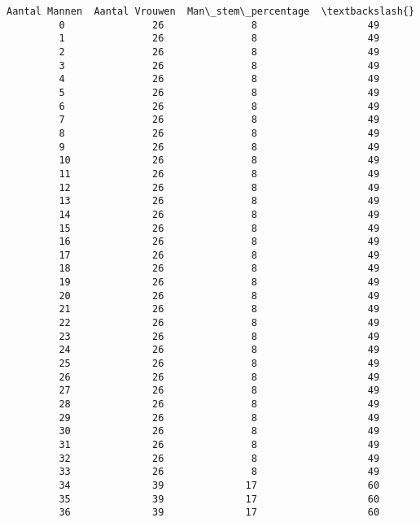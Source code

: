 \documentclass{article}
\begin{document}
\begin{Verbatim}[commandchars=\\\{\}]
              Aantal Mannen  Aantal Vrouwen  Man\_stem\_percentage  \textbackslash{}
         0               26               8                   49   
         1               26               8                   49   
         2               26               8                   49   
         3               26               8                   49   
         4               26               8                   49   
         5               26               8                   49   
         6               26               8                   49   
         7               26               8                   49   
         8               26               8                   49   
         9               26               8                   49   
         10              26               8                   49   
         11              26               8                   49   
         12              26               8                   49   
         13              26               8                   49   
         14              26               8                   49   
         15              26               8                   49   
         16              26               8                   49   
         17              26               8                   49   
         18              26               8                   49   
         19              26               8                   49   
         20              26               8                   49   
         21              26               8                   49   
         22              26               8                   49   
         23              26               8                   49   
         24              26               8                   49   
         25              26               8                   49   
         26              26               8                   49   
         27              26               8                   49   
         28              26               8                   49   
         29              26               8                   49   
         30              26               8                   49   
         31              26               8                   49   
         32              26               8                   49   
         33              26               8                   49   
         34              39              17                   60   
         35              39              17                   60   
         36              39              17                   60   

\end{Verbatim}
\end{document}
